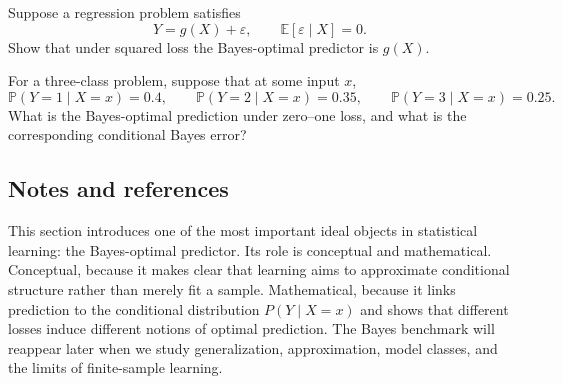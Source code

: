 \begin{exercise}
Suppose a regression problem satisfies
\[
Y = g(X)+\varepsilon,
\qquad
\mathbb E[\varepsilon\mid X]=0.
\]
Show that under squared loss the Bayes-optimal predictor is $g(X)$.
\end{exercise}

\begin{exercise}
For a three-class problem, suppose that at some input $x$,
\[
\mathbb P(Y=1\mid X=x)=0.4,\qquad
\mathbb P(Y=2\mid X=x)=0.35,\qquad
\mathbb P(Y=3\mid X=x)=0.25.
\]
What is the Bayes-optimal prediction under zero--one loss, and what is the corresponding conditional Bayes error?
\end{exercise}

\subsection*{Notes and references}

This section introduces one of the most important ideal objects in statistical learning: the Bayes-optimal predictor. Its role is conceptual and mathematical. Conceptual, because it makes clear that learning aims to approximate conditional structure rather than merely fit a sample. Mathematical, because it links prediction to the conditional distribution $P(Y\mid X=x)$ and shows that different losses induce different notions of optimal prediction. The Bayes benchmark will reappear later when we study generalization, approximation, model classes, and the limits of finite-sample learning.